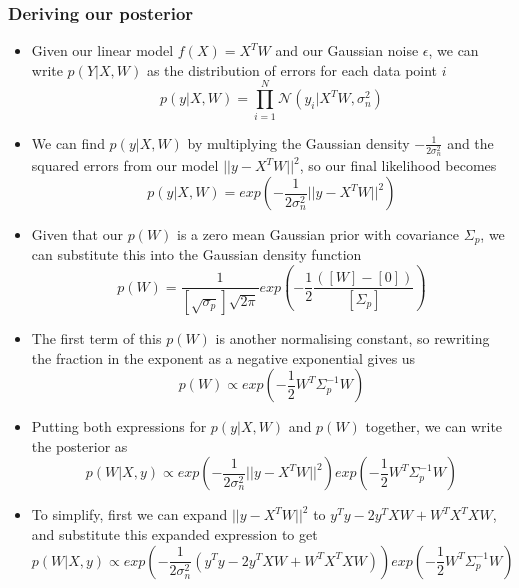 \documentclass[12pt]{article}
\begin{document}
\subsubsection{Deriving our posterior}
\begin{itemize}
     \item Given our linear model $f(X) = X^TW$ and our Gaussian noise $\epsilon$, we can write $p(Y|X,W)$ as the distribution of errors for each data point $i$
 \begin{equation}
     p(y|X,W) = \prod_{i=1}^N \mathcal{N}(y_i|X^TW, \sigma^2_n)
 \end{equation}
     \item We can find $p(y|X,W)$ by multiplying the Gaussian density $-\frac{1}{2\sigma^2_n}$ and the squared errors from our model $||y -X^TW||^2$, so our final likelihood becomes
 \begin{equation}
     p(y|X,W) = exp\left(-\frac{1}{2\sigma^2_n}||y -X^TW||^2\right)
 \end{equation}
     \item Given that our $p(W)$ is a zero mean Gaussian prior with covariance $\Sigma_p$, we can substitute this into the Gaussian density function
 \begin{equation}
     p(W) = \frac{1}{[\sqrt{\sigma_p}]\sqrt{2\pi}} exp\left(-\frac{1}{2}\frac{([W]-[0])}{[\Sigma_p]}\right)
 \end{equation}
     \item The first term of this $p(W)$ is another normalising constant, so rewriting the fraction in the exponent as a negative exponential gives us
 \begin{equation}
     p(W) \propto exp\left(-\frac{1}{2}W^T\Sigma_p^{-1}W\right)
 \end{equation}
     \item Putting both expressions for $p(y|X,W)$ and $p(W)$ together, we can write the posterior as
 \begin{equation}
     p(W|X,y) \propto exp\left(-\frac{1}{2\sigma^2_n}||y -X^TW||^2\right)exp\left(-\frac{1}{2}W^T\Sigma_p^{-1}W\right)
 \end{equation}
     \item To simplify, first we can expand $||y - X^TW||^2$ to $y^Ty - 2y^TXW + W^TX^TXW$, and substitute this expanded expression to get
 \begin{equation}
     p(W|X,y) \propto exp\left(-\frac{1}{2\sigma^2_n}(y^Ty - 2y^TXW + W^TX^TXW)\right)exp\left(-\frac{1}{2}W^T\Sigma_p^{-1}W\right)
 \end{equation}

\end{itemize}
\end{document}
